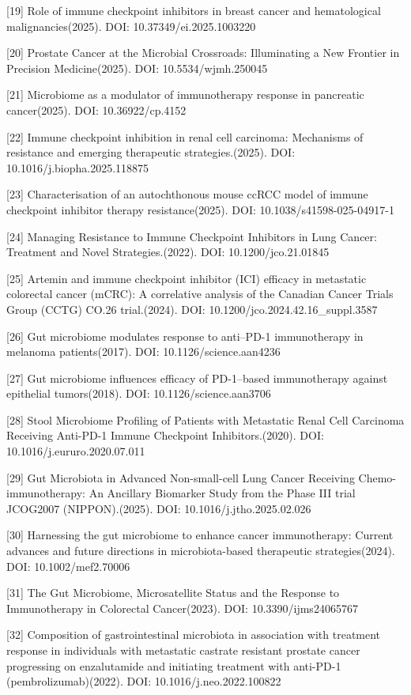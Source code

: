 \documentclass[11pt]{article}
\begin{document}
{[}19{]} Role of immune checkpoint inhibitors in breast cancer and hematological malignancies(2025). DOI: 10.37349/ei.2025.1003220

{[}20{]} Prostate Cancer at the Microbial Crossroads: Illuminating a New Frontier in Precision Medicine(2025). DOI: 10.5534/wjmh.250045

{[}21{]} Microbiome as a modulator of immunotherapy response in pancreatic cancer(2025). DOI: 10.36922/cp.4152

{[}22{]} Immune checkpoint inhibition in renal cell carcinoma: Mechanisms of resistance and emerging therapeutic strategies.(2025). DOI: 10.1016/j.biopha.2025.118875

{[}23{]} Characterisation of an autochthonous mouse ccRCC model of immune checkpoint inhibitor therapy resistance(2025). DOI: 10.1038/s41598-025-04917-1

{[}24{]} Managing Resistance to Immune Checkpoint Inhibitors in Lung Cancer: Treatment and Novel Strategies.(2022). DOI: 10.1200/jco.21.01845

{[}25{]} Artemin and immune checkpoint inhibitor (ICI) efficacy in metastatic colorectal cancer (mCRC): A correlative analysis of the Canadian Cancer Trials Group (CCTG) CO.26 trial.(2024). DOI: 10.1200/jco.2024.42.16\_suppl.3587

{[}26{]} Gut microbiome modulates response to anti--PD-1 immunotherapy in melanoma patients(2017). DOI: 10.1126/science.aan4236

{[}27{]} Gut microbiome influences efficacy of PD-1--based immunotherapy against epithelial tumors(2018). DOI: 10.1126/science.aan3706

{[}28{]} Stool Microbiome Profiling of Patients with Metastatic Renal Cell Carcinoma Receiving Anti-PD-1 Immune Checkpoint Inhibitors.(2020). DOI: 10.1016/j.eururo.2020.07.011

{[}29{]} Gut Microbiota in Advanced Non-small-cell Lung Cancer Receiving Chemo-immunotherapy: An Ancillary Biomarker Study from the Phase III trial JCOG2007 (NIPPON).(2025). DOI: 10.1016/j.jtho.2025.02.026

{[}30{]} Harnessing the gut microbiome to enhance cancer immunotherapy: Current advances and future directions in microbiota-based therapeutic strategies(2024). DOI: 10.1002/mef2.70006

{[}31{]} The Gut Microbiome, Microsatellite Status and the Response to Immunotherapy in Colorectal Cancer(2023). DOI: 10.3390/ijms24065767

{[}32{]} Composition of gastrointestinal microbiota in association with treatment response in individuals with metastatic castrate resistant prostate cancer progressing on enzalutamide and initiating treatment with anti-PD-1 (pembrolizumab)(2022). DOI: 10.1016/j.neo.2022.100822
\end{document}
